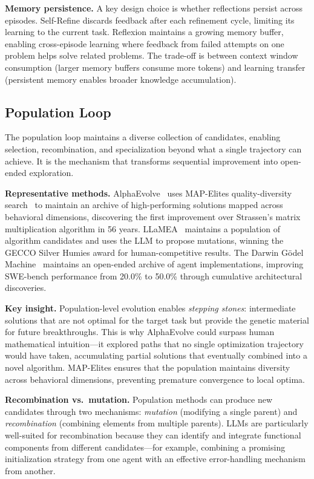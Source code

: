 \documentclass[11pt,a4paper]{article}
\begin{document}
\textbf{Memory persistence.} A key design choice is whether reflections persist across episodes. Self-Refine discards feedback after each refinement cycle, limiting its learning to the current task. Reflexion maintains a growing memory buffer, enabling cross-episode learning where feedback from failed attempts on one problem helps solve related problems. The trade-off is between context window consumption (larger memory buffers consume more tokens) and learning transfer (persistent memory enables broader knowledge accumulation).

\subsection{Population Loop}

The population loop maintains a diverse collection of candidates, enabling selection, recombination, and specialization beyond what a single trajectory can achieve. It is the mechanism that transforms sequential improvement into open-ended exploration.

\textbf{Representative methods.} AlphaEvolve~\citep{novikov2025alphaevolve} uses MAP-Elites quality-diversity search~\citep{mouret2015mapelites} to maintain an archive of high-performing solutions mapped across behavioral dimensions, discovering the first improvement over Strassen's matrix multiplication algorithm in 56 years. LLaMEA~\citep{lanzi2024llamea} maintains a population of algorithm candidates and uses the LLM to propose mutations, winning the GECCO Silver Humies award for human-competitive results. The Darwin G\"{o}del Machine~\citep{zhang2025dgm} maintains an open-ended archive of agent implementations, improving SWE-bench performance from 20.0\% to 50.0\% through cumulative architectural discoveries.

\textbf{Key insight.} Population-level evolution enables \emph{stepping stones}: intermediate solutions that are not optimal for the target task but provide the genetic material for future breakthroughs. This is why AlphaEvolve could surpass human mathematical intuition---it explored paths that no single optimization trajectory would have taken, accumulating partial solutions that eventually combined into a novel algorithm. MAP-Elites ensures that the population maintains diversity across behavioral dimensions, preventing premature convergence to local optima.

\textbf{Recombination vs.\ mutation.} Population methods can produce new candidates through two mechanisms: \emph{mutation} (modifying a single parent) and \emph{recombination} (combining elements from multiple parents). LLMs are particularly well-suited for recombination because they can identify and integrate functional components from different candidates---for example, combining a promising initialization strategy from one agent with an effective error-handling mechanism from another.
\end{document}

